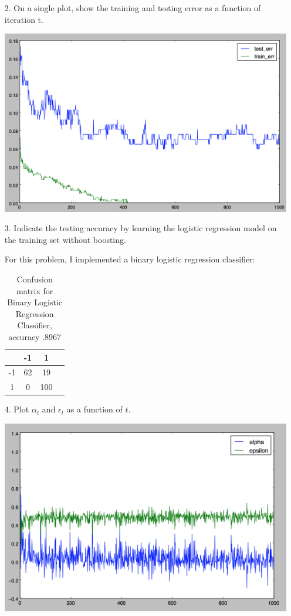 \documentclass[11pt]{article}
\begin{document}
\begin{enumerate}
\item [2.] On a single plot, show the training and testing error as a function of iteration t.

\includegraphics[scale=.5]{images/p3testtrain.png}

\item[3.] Indicate the testing accuracy by learning the logistic regression model on the training set without boosting.

For this problem, I implemented a binary logistic regression classifier:

\begin{table}[!th]
\centering
\begin{tabular}{|c|c|cl}
\hline
& -1 & 1 \\
\hline
-1 & 62 & 19 \\
1 & 0 & 100 \\
\hline
\end{tabular}
\caption{Confusion matrix for Binary Logistic Regression Classifier, accuracy .8967}
\label{ex:table}
\end{table}


\item[4.] Plot $\alpha_t$ and $\epsilon_t$ as a function of $t$.

\includegraphics[scale=.5]{images/p3params.png}


\end{enumerate}
\end{document}
